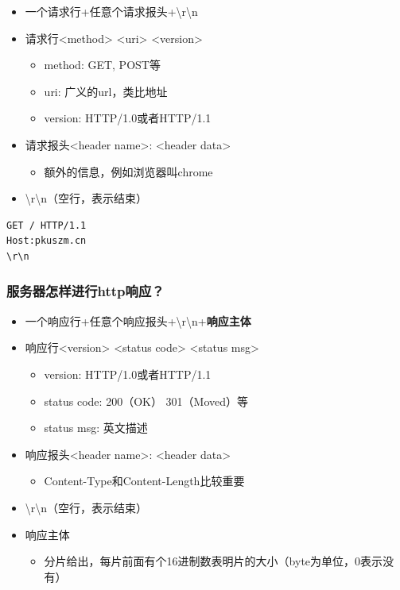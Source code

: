 \documentclass[AutoFakeBold]{beamer}
\begin{document}
{\begin{frame}[fragile]
        \begin{itemize}
            \item 一个请求行+任意个请求报头+\textbackslash r\textbackslash n
            \item 请求行<method> <uri> <version> \begin{itemize}
                \item method: GET, POST等
                \item uri: 广义的url，类比地址
                \item version: HTTP/1.0或者HTTP/1.1
            \end{itemize}
            \item 请求报头<header name>: <header data>\begin{itemize}
                \item 额外的信息，例如浏览器叫chrome
            \end{itemize}
            \item \textbackslash r\textbackslash n（空行，表示结束）
        \end{itemize}
        \begin{lstlisting}
GET / HTTP/1.1
Host:pkuszm.cn
\r\n
        \end{lstlisting}
    \end{frame}

    \begin{frame}
        \frametitle{服务器怎样进行http响应？}
    
        \begin{itemize}
            \item 一个响应行+任意个响应报头+\textbackslash r\textbackslash n+\textbf{响应主体}
            \item 响应行<version> <status code> <status msg> \begin{itemize}
                \item version: HTTP/1.0或者HTTP/1.1
                \item status code: 200（OK） 301（Moved）等
                \item status msg: 英文描述
            \end{itemize}
            \item 响应报头<header name>: <header data>\begin{itemize}
                \item Content-Type和Content-Length比较重要
            \end{itemize}
            \item \textbackslash r\textbackslash n（空行，表示结束）
            \item 响应主体\begin{itemize}
                \item 分片给出，每片前面有个16进制数表明片的大小（byte为单位，0表示没有）
            \end{itemize}
        \end{itemize}
    \end{frame}

}
\end{document}
